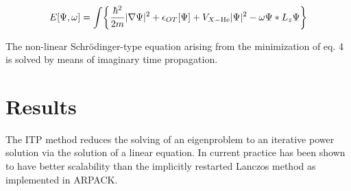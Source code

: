 \documentclass[a0b,landscape]{a0poster}
\DeclarePairedDelimiter{\biggBc}{\bigg\{}{\bigg\}}
\begin{document}
\begin{multicols}{3}
\begin{equation}
\label{eq:OTDFT}
E[\Psi,\omega]=\int\biggBc{\frac{\hbar^2}{2m}|\nabla\Psi|^2+\epsilon_{OT}[\Psi]+V_{X-\text{He}}|\Psi|^2-\omega \Psi*L_z\Psi}
\end{equation}

The non-linear Schrödinger-type equation arising from the minimization
of eq. 4 is solved by means of imaginary time propagation.


 
\section*{Results}
The ITP method reduces the solving of an eigenproblem to an iterative power solution via the solution of a linear equation. 
In current practice has been shown to have better scalability than the implicitly restarted Lanczos method as implemented in ARPACK. 


\end{multicols}
\end{document}
